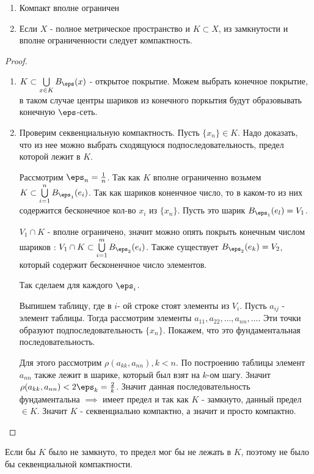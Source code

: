 \begin{theorem}[Хаусдорфа] \thmslashn

  \begin{enumerate}
    \item Компакт вполне ограничен 
    \item Если $X$ - полное метрическое пространство и $K \subset X$, из замкнутости и вполне ограниченности следует компактность.
  \end{enumerate}

  \begin{proof} \thmslashn

    \begin{enumerate}
      \item $K \subset \bigcup\limits_{x \in K}{B_{\eps}(x)}$ - открытое покрытие. Можем выбрать конечное покрытие, в таком случае центры шариков из конечного поркытия будут образовывать конечную $\eps$-сеть.
      \item Проверим секвенциальную компактность. Пусть $\{x_n\} \in K$. Надо доказать, что из нее можно выбрать сходящуюся подпоследовательность, предел которой лежит в $K$. \par
        Рассмотрим $\eps_n = \frac{1}{n}$. 
        Так как $K$ вполне ограниченно возьмем $K \subset \bigcup\limits_{i = 1}^{n}{B_{\eps_1}(e_i)}$.
        Так как шариков коненчное число, то в каком-то из них содержится бесконечное кол-во $x_i$ из $\{x_n\}$. Пусть это шарик $B_{\eps_1}(e_l) = V_1$. \par
      $V_1 \cap K$ - вполне ограничено, значит можно опять покрыть конечным числом шариков : $V_1\cap K \subset \bigcup\limits_{i = 1}^{m}{B_{\eps_2}(e_i)}$. Также существует $B_{\eps_2}(e_k) = V_2$, который содержит бесконенчное число элементов. \par
      Так сделаем для каждого $\eps_i$. \par
      Выпишем таблицу, где в $i$- ой строке стоят элементы из $V_i$. Пусть $a_{ij}$ - элемент таблицы. Тогда рассмотрим элементы $a_{11}, a_{22}, \dots, a_{nn}, \dots$. Эти точки образуют подпоследовательность $\{x_n\}$. Покажем, что это фундаментальная последовательность. \par
      Для этого рассмотрим $\rho(a_{kk}, a_{nn}), k < n$. По построению таблицы элемент $a_{nn}$ также лежит в шарике, который был взят на $k$-ом шагу. Значит $\rho(a_{kk}, a_{nn}) < 2\eps_{k} = \frac{2}{k}$. Значит данная последовательность фундаментальна $\implies$ имеет предел и так как $K$ - замкнуто, данный предел $\in K$. Значит $K$ - секвенциально компактно, а значит и просто компактно. 
    \end{enumerate}
  \end{proof}
  \begin{remark} \thmslashn

    Если бы $K$ было не замкнуто, то предел мог бы не лежать в $K$, поэтому не было бы секвенциальной компактности.
  \end{remark}
\end{theorem}

